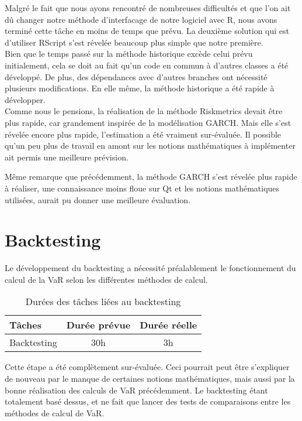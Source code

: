 \documentclass[a4paper]{report}
\begin{document}
Malgré le fait que nous ayons rencontré de nombreuses difficultés et que l'on ait dû changer notre méthode d'interfacage de notre logiciel avec R, nous avons terminé cette tâche en moins de temps que prévu.
La deuxième solution qui est d'utiliser RScript s'est révelée beaucoup plus simple que notre première.\\

Bien que le temps passé sur la méthode historique excède celui prévu initialement, cela se doit au fait qu'un code en commun à d'autres classes a été développé.
De plus, des dépendances avec d'autres branches ont nécessité plusieurs modifications.
En elle même, la méthode historique a été rapide à développer.\\

Comme nous le pensions, la réalisation de la méthode Riskmetrics devait être plus rapide, car grandement inspirée de la modélisation GARCH.
Mais elle s'est révelée encore plus rapide, l'estimation a été vraiment sur-évaluée.
Il possible qu'un peu plus de travail en amont sur les notions mathématiques à implémenter ait permis une meilleure prévision.

Même remarque que précédemment, la méthode GARCH s'est révelée plus rapide à réaliser, une connaissance moins floue sur Qt et les notions mathématiques utilisées, aurait pu donner une meilleure évaluation.

\section{Backtesting}
Le développement du backtesting a nécessité préalablement le fonctionnement du calcul de la VaR selon les différentes méthodes de calcul.

\begin{table}[H]
\centering
  \begin{tabularx}{0.8\textwidth}{| X | c | c |}
    \hline
	Tâches & Durée prévue & Durée réelle \\
    \hline
    Backtesting &  30h & 3h\\
    \hline
  \end{tabularx}
  \caption{Durées des tâches liées au backtesting}
\end{table}

Cette étape a été complètement sur-évaluée.
Ceci pourrait peut être s'expliquer de nouveau par le manque de certaines notions mathématiques, mais aussi par la bonne réalisation des calculs de VaR précédemment.
Le backtesting étant totalement basé dessus, et ne fait que lancer des tests de comparaisons entre les méthodes de calcul de VaR.
\end{document}
